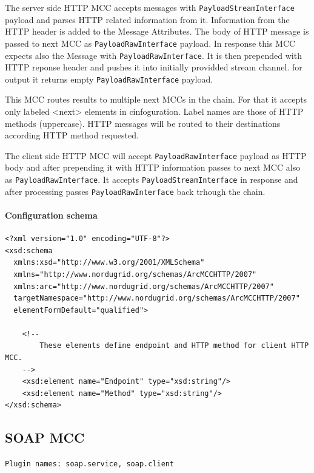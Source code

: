 \documentclass{book}
\begin{document}

The server side HTTP MCC accepts messages with \texttt{PayloadStreamInterface} payload and parses HTTP related information from it. Information from the HTTP header is added to the Message Attributes. The body of HTTP message is passed to next MCC as \texttt{PayloadRawInterface} payload. In response this MCC expects also the Message with \texttt{PayloadRawInterface}. It is then prepended with HTTP reponse header and pushes it into initially providded stream channel. for output it returns empty \texttt{PayloadRawInterface} payload.

This MCC routes results to multiple next MCCs in the chain. For that it accepts only labeled <next> elements in cinfoguration. Label names are those of HTTP methods (uppercase). HTTP messages will be routed to their destinations according HTTP method requested.

The client side HTTP MCC will accept \texttt{PayloadRawInterface} payload as HTTP body and after prepending it with HTTP information passes to next MCC also as \texttt{PayloadRawInterface}. It accepts \texttt{PayloadStreamInterface} in response and after processing passes \texttt{PayloadRawInterface} back trhough the chain.

\paragraph{Configuration schema}

\begin{verbatim}
<?xml version="1.0" encoding="UTF-8"?>
<xsd:schema
  xmlns:xsd="http://www.w3.org/2001/XMLSchema"
  xmlns="http://www.nordugrid.org/schemas/ArcMCCHTTP/2007"
  xmlns:arc="http://www.nordugrid.org/schemas/ArcMCCHTTP/2007"
  targetNamespace="http://www.nordugrid.org/schemas/ArcMCCHTTP/2007"
  elementFormDefault="qualified">

    <!--
        These elements define endpoint and HTTP method for client HTTP MCC.
    -->
    <xsd:element name="Endpoint" type="xsd:string"/>
    <xsd:element name="Method" type="xsd:string"/>
</xsd:schema>
\end{verbatim}


\subsection{SOAP MCC}

\texttt{Plugin names: soap.service, soap.client}
\end{document}
